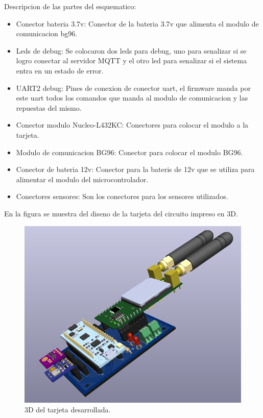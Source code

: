 Descripcion de las partes del esquematico: 

\begin{itemize}
  \item Conector bateria 3.7v: Conector de la bateria 3.7v que alimenta el modulo de comunicacion bg96.
  \item Leds de debug: Se colocaron dos leds para debug, uno para senalizar si se logro conectar al servidor MQTT y el otro led para senalizar si el sistema entra en un estado de error.
  \item UART2 debug: Pines de conexion de conector uart, el firmware manda por este uart todos los comandos que manda al modulo de comunicacion y las repuestas del mismo.
  \item Conector modulo Nucleo-L432KC: Conectores para colocar el modulo a la tarjeta.
  \item Modulo de comunicacion BG96: Conector para colocar el modulo BG96.
  \item Conector de bateria 12v: Conector para la bateris de 12v que se utiliza para alimentar el modulo del microcontrolador.
  \item Conectores sensores: Son los conectores para los sensores utilizados.  
\end{itemize}

En la figura se muestra del diseno de la tarjeta del circuito impreso en 3D.
\begin{figure}[htbp]
  \centering
	\includegraphics[width=\textwidth]{./Figures/tarjeta3d.png}
  \caption{3D del tarjeta desarrollada.}
	\label{fig:3D del modulo}
\end{figure}


